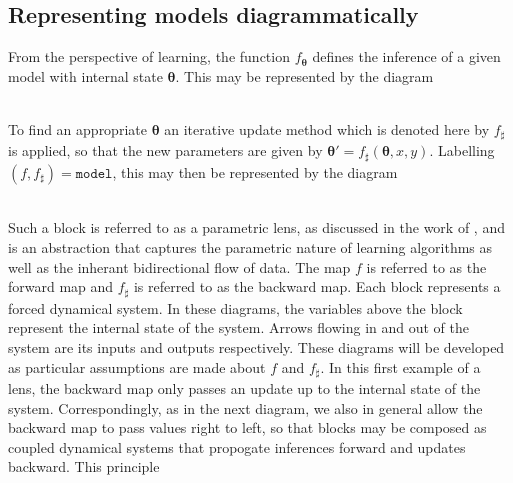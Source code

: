 \documentclass[10pt,a4paper]{article}
\begin{document}
\subsection{Representing models diagrammatically}
From the perspective of learning, the function $f_{\boldsymbol\theta}$ defines the inference of a given model with internal state $\boldsymbol\theta$.
This may be represented by the diagram\\
\\
To find an appropriate $\boldsymbol\theta$ an iterative update method which is denoted here by $f_\sharp$ is applied, so that the new parameters are given by $\boldsymbol\theta'=f_\sharp(\boldsymbol\theta,x,y)$.
Labelling $(f,f_\sharp)=\texttt{model}$, this may then be represented by the diagram\\
\\
Such a block is referred to as a parametric lens, as discussed in the work of \cite{cruttwell2024deeplearningparametriclenses}, and is an abstraction that captures the parametric nature of learning algorithms as well as the inherant bidirectional flow of data.
The map $f$ is referred to as the forward map and $f_\sharp$ is referred to as the backward map.
Each block represents a forced dynamical system.
In these diagrams, the variables above the block represent the internal state of the system.
Arrows flowing in and out of the system are its inputs and outputs respectively.
These diagrams will be developed as particular assumptions are made about $f$ and $f_\sharp$.
In this first example of a lens, the backward map only passes an update up to the internal state of the system.
Correspondingly, as in the next diagram, we also in general allow the backward map to pass values right to left, so that blocks may be composed as coupled dynamical systems that propogate inferences forward and updates backward.
This principle 
\end{document}
